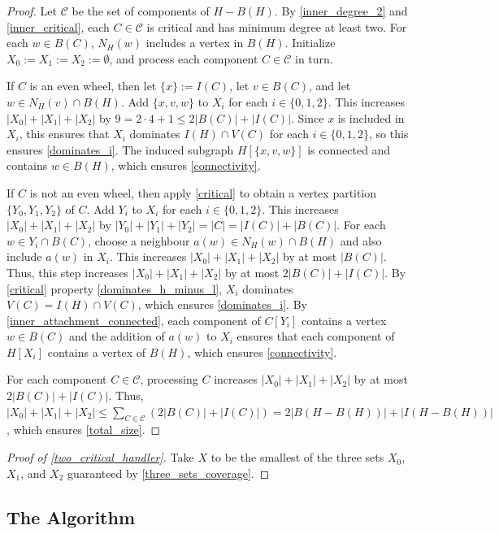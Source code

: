 \documentclass{patmorin}
\begin{document}
\begin{proof}
  Let $\mathcal{C}$ be the set of components of $H-B(H)$. By \ref{inner_degree_2} and \ref{inner_critical}, each $C\in\mathcal{C}$ is critical and has minimum degree at least two.  For each $w\in B(C)$, $N_H(w)$ includes a vertex in $B(H)$.  Initialize $X_0:=X_1:=X_2:=\emptyset$, and process each component $C\in\mathcal{C}$ in turn.

If $C$ is an even wheel, then let $\{x\}:=I(C)$, let $v\in B(C)$, and let $w\in N_H(v)\cap B(H)$.  Add $\{x,v,w\}$ to $X_{i}$ for each $i\in\{0,1,2\}$.  This increases $|X_0|+|X_1|+|X_2|$ by $9=2\cdot 4+1\le 2|B(C)|+|I(C)|$.  Since $x$ is included in $X_i$, this ensures that $X_i$ dominates $I(H)\cap V(C)$ for each $i\in\{0,1,2\}$, so this ensures \ref{dominates_i}. The induced subgraph $H[\{x,v,w\}]$ is connected and contains $w\in B(H)$, which ensures \ref{connectivity}.

If $C$ is not an even wheel, then apply \cref{critical} to obtain a vertex partition $\{Y_0,Y_1,Y_2\}$ of $C$.  Add $Y_i$ to $X_i$ for each $i\in \{0,1,2\}$. This increases $|X_0|+|X_1|+|X_2|$ by $|Y_0|+|Y_1|+|Y_2| = |C| = |I(C)|+|B(C)|$.  For each $w\in Y_i\cap B(C)$, choose a neighbour $a(w)\in N_H(w)\cap B(H)$ and also include $a(w)$ in $X_i$.  This increases $|X_0|+|X_1|+|X_2|$ by at most $|B(C)|$. Thus, this step increases $|X_0|+|X_1|+|X_2|$ by at most $2|B(C)|+|I(C)|$.  By \cref{critical} property \ref{dominates_h_minus_l}, $X_i$ dominates $V(C)=I(H)\cap V(C)$, which ensures \ref{dominates_i}.  By \ref{inner_attachment_connected}, each component of $C[Y_i]$ contains a vertex $w\in B(C)$ and the addition of $a(w)$ to $X_i$ ensures that each component of $H[X_i]$ contains a vertex of $B(H)$, which ensures \ref{connectivity}.

For each component $C\in\mathcal{C}$, processing $C$ increases $|X_0|+|X_1|+|X_2|$ by at most $2|B(C)|+|I(C)|$.  Thus, $|X_0|+|X_1|+|X_2| \le \sum_{C\in\mathcal{C}}(2|B(C)|+|I(C)|) = 2|B(H-B(H))| + |I(H-B(H))|$, which ensures \ref{total_size}.
\end{proof}

\begin{proof}[Proof of \cref{two_critical_handler}]
  Take $X$ to be the smallest of the three sets $X_0$, $X_1$, and $X_2$ guaranteed by \cref{three_sets_coverage}.
\end{proof}


\subsection{The Algorithm}
\end{document}
